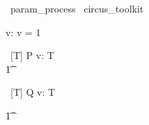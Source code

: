 
\begin{zsection}
  \SECTION\ param\_process \parents\ circus\_toolkit
\end{zsection}

\begin{axdef}
   v: \nat
\where
   v = 1
\end{axdef}

\begin{circus}
    \circprocess\ [T] P \circdef  v:  T \circspot \circbegin\  \\
    \t1 \circspot \Skip \\
    \circend
\end{circus}


\begin{circus}
    \circprocess\ [T] Q \circdef  v:  T \circspot \circbegin\
\end{circus}

\begin{circusaction}
   \t1 \circspot \Stop
\end{circusaction}

\begin{circus}
   \circend
\end{circus}

